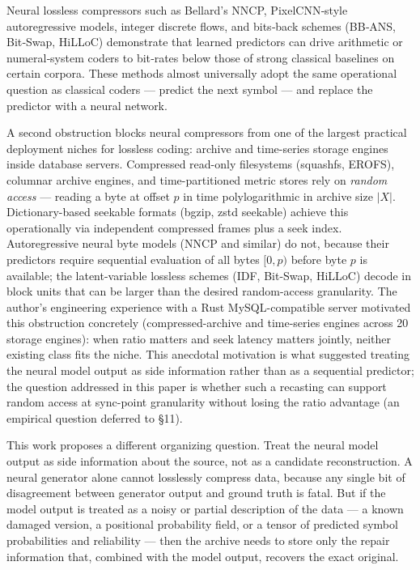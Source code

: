 \documentclass[
]{article}
\begin{document}
Neural lossless compressors such as Bellard's NNCP, PixelCNN‑style
autoregressive models, integer discrete flows, and bits‑back schemes
(BB‑ANS, Bit‑Swap, HiLLoC) demonstrate that learned predictors can drive
arithmetic or numeral‑system coders to bit‑rates below those of strong
classical baselines on certain corpora. These methods almost universally
adopt the same operational question as classical coders --- predict the
next symbol --- and replace the predictor with a neural network.

A second obstruction blocks neural compressors from one of the largest
practical deployment niches for lossless coding: archive and
time-series storage engines inside database servers. Compressed
read-only filesystems (squashfs, EROFS), columnar archive engines, and
time-partitioned metric stores rely on \emph{random access} ---
reading a byte at offset $p$ in time polylogarithmic in archive
size $|X|$. Dictionary-based seekable formats (bgzip, zstd seekable)
achieve this operationally via independent compressed frames plus a
seek index. Autoregressive neural byte models (NNCP and similar) do
not, because their predictors require sequential evaluation of all
bytes $[0, p)$ before byte $p$ is available; the latent-variable lossless schemes
(IDF, Bit-Swap, HiLLoC) decode in block units that can be larger than
the desired random-access granularity. The author's engineering
experience with a Rust MySQL-compatible server motivated this
obstruction concretely (compressed-archive and time-series engines
across 20 storage engines): when ratio matters and seek latency
matters jointly, neither existing class fits the niche. This anecdotal
motivation is what suggested treating the neural model output as side
information rather than as a sequential predictor; the question
addressed in this paper is whether such a recasting can support random
access at sync-point granularity without losing the ratio advantage
(an empirical question deferred to §11).

This work proposes a different organizing question. Treat the neural
model output as side information about the source, not as a candidate
reconstruction. A neural generator alone cannot losslessly compress
data, because any single bit of disagreement between generator output
and ground truth is fatal. But if the model output is treated as a noisy
or partial description of the data --- a known damaged version, a
positional probability field, or a tensor of predicted symbol
probabilities and reliability --- then the archive needs to store only
the repair information that, combined with the model output, recovers
the exact original.
\end{document}
